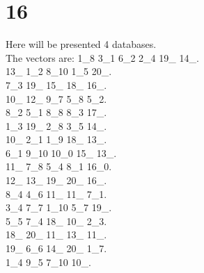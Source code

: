 \chapter{16}
\indent Here will be presented 4 databases.\\
The vectors are:
1\_8 3\_1 6\_2 2\_4 19\_ 14\_.\\13\_ 1\_2 8\_10 1\_5 20\_.\\7\_3 19\_ 15\_ 18\_ 16\_.\\10\_ 12\_ 9\_7 5\_8 5\_2.\\8\_2 5\_1 8\_8 8\_3 17\_.\\1\_3 19\_ 2\_8 3\_5 14\_.\\10\_ 2\_1 1\_9 18\_ 13\_.\\6\_1 9\_10 10\_0 15\_ 13\_.\\11\_ 7\_8 5\_4 8\_1 16\_0.\\12\_ 13\_ 19\_ 20\_ 16\_.\\8\_4 4\_6 11\_ 11\_ 7\_1.\\3\_4 7\_7 1\_10 5\_7 19\_.\\5\_5 7\_4 18\_ 10\_ 2\_3.\\18\_ 20\_ 11\_ 13\_ 11\_.\\19\_ 6\_6 14\_ 20\_ 1\_7.\\1\_4 9\_5 7\_10 10\_.\\